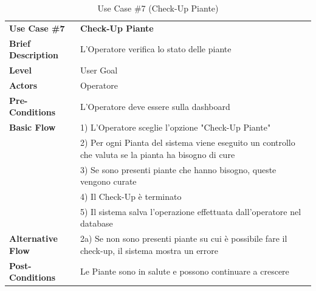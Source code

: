 \documentclass{article}
\begin{document}
\begin{table}[p]
    \begin{tabularx}{\textwidth}{ | l  X | }
        \rowcolor{lightgray!70}
        \hline
        \textbf{Use Case \#7} & \textbf{Check-Up Piante }\\[0.5ex]
        \textbf{Brief Description} & L'Operatore verifica lo stato delle piante\\
        \rowcolor{blue!10}
        \textbf{Level} & User Goal\\
        \textbf{Actors} & Operatore \\
        \rowcolor{blue!10}
        \textbf{Pre-Conditions} & L'Operatore deve essere sulla dashboard\\
        \textbf{Basic Flow} & 1) L'Operatore sceglie l'opzione "Check-Up Piante"\\
        & 2) Per ogni Pianta del sistema viene eseguito un controllo che valuta se la pianta ha bisogno di cure\\
        & 3) Se sono presenti piante che hanno bisogno, queste vengono curate\\
        & 4) Il Check-Up è terminato\\
        & 5) Il sistema salva l'operazione effettuata dall'operatore nel database \\
        \rowcolor{blue!10}
        \textbf{Alternative Flow} & 2a) Se non sono presenti piante su cui è possibile fare il check-up, il sistema mostra un errore\\
        \textbf{Post-Conditions} & Le Piante sono in salute e possono continuare a crescere\\
        \hline
    \end{tabularx}
    \caption{Use Case \#7 (Check-Up Piante)}
\end{table}
\end{document}
